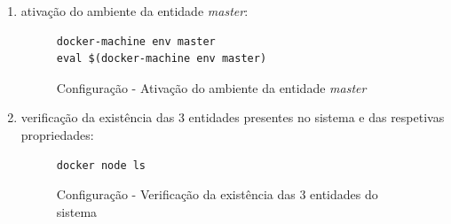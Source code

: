 \documentclass[a4paper]{report}
\begin{document}
{\begin{enumerate}[label=\textbf{\arabic*.}]
                \begin{figure}[H]
                    \centering
                    \begin{verbatim}
docker-machine ssh worker1 sudo docker swarm join --token \
               SWMTKN-1-5zfy2iio54tma997pnt96gq5095fimqn2hxr2a8j16ogq0n3c9-0kp6mi5iuj956gpl9sfccd5bo\
               10.132.0.8:2377
                    \end{verbatim}
                    \vspace{-5mm}
                    \caption{Configuração - \textit{swarm} \textsl{worker1}}
                    \label{fig:5}
                \end{figure}

                \begin{figure}[H]
                    \centering
                    \begin{verbatim}
docker-machine ssh worker2 sudo docker swarm join --token \
               SWMTKN-1-5zfy2iio54tma997pnt96gq5095fimqn2hxr2a8j16ogq0n3c9-0kp6mi5iuj956gpl9sfccd5bo\
               10.132.0.8:2377
                    \end{verbatim}
                    \vspace{-5mm}
                    \caption{Configuração - \textit{swarm} \textsl{worker2}}
                    \label{fig:6}
                \end{figure}

                \item ativação do ambiente da entidade \textsl{master}:
                \begin{figure}[H]
                    \centering
                    \begin{verbatim}
docker-machine env master
eval $(docker-machine env master)
                    \end{verbatim}
                    \vspace{-5mm}
                    \caption{Configuração - Ativação do ambiente da entidade \textsl{master}}
                    \label{fig:7}
                \end{figure}

                \item verificação da existência das 3 entidades presentes no sistema e das respetivas propriedades:
                \begin{figure}[H]
                    \centering
                    \begin{verbatim}
docker node ls
                    \end{verbatim}
                    \vspace{-5mm}
                    \caption{Configuração - Verificação da existência das 3 entidades do sistema}
                    \label{fig:8}
                \end{figure}


\end{enumerate}}
\end{document}
